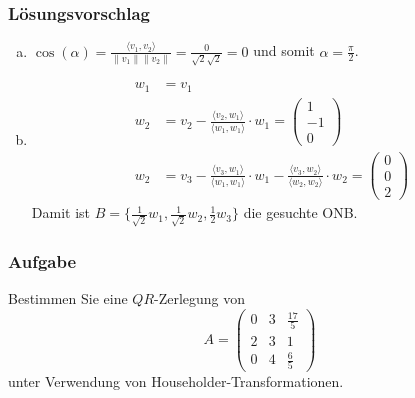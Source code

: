 \documentclass[a4paper,11pt]{scrartcl}
\newcounter{auf}
\newcommand{\Aufgabe}%
        {\addtocounter{auf}{1} \subsubsection*{\rmfamily  Aufgabe \theauf \hspace{1em}} }
\begin{document}
\subsubsection*{Lösungsvorschlag}
\begin{enumerate}[a)]
\item  $\cos(\alpha)=\frac{\langle v_1,v_2\rangle}{\|v_1\|\|v_2\|}=\frac{0}{\sqrt{2}\sqrt{2}}=0$ und somit $\alpha=\frac{\pi}{2}$.
\item
\begin{align*}
w_1&=v_1\\
w_2&=v_2-\frac{\langle v_2,w_1 \rangle}{\langle w_1,w_1\rangle}\cdot w_1=\begin{pmatrix} 1\\-1\\0\end{pmatrix}\\
w_2&=v_3-\frac{\langle v_3,w_1 \rangle}{\langle w_1,w_1\rangle}\cdot w_1-\frac{\langle v_3,w_2 \rangle}{\langle w_2,w_2\rangle}\cdot w_2=\begin{pmatrix} 0\\0\\2\end{pmatrix}
\end{align*}
Damit ist $B=\{\frac{1}{\sqrt{2}}w_1,\frac{1}{\sqrt{2}}w_2,\frac{1}{2}w_3\}$ die gesuchte ONB.
\end{enumerate}


\newpage
\Aufgabe

Bestimmen Sie eine $QR$-Zerlegung von 
$$
A=\begin{pmatrix}0&3&\frac{17}{5}\\ 2&3&1\\0&4&\frac{6}{5}\end{pmatrix}
$$
unter Verwendung von Householder-Transformationen.
%
%
\end{document}
